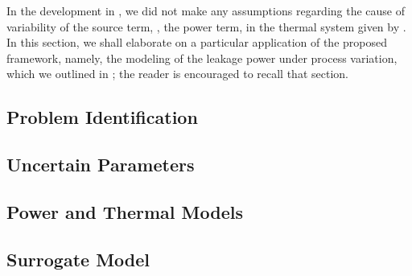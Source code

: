 In the development in , we did not make any assumptions regarding the cause of variability of the source term, \ie, the power term, in the thermal system given by . In this section, we shall elaborate on a particular application of the proposed framework, namely, the modeling of the leakage power under process variation, which we outlined in ; the reader is encouraged to recall that section.

\subsection{Problem Identification} 


\subsection{Uncertain Parameters} 


\subsection{Power and Thermal Models}  


\subsection{Surrogate Model} 

